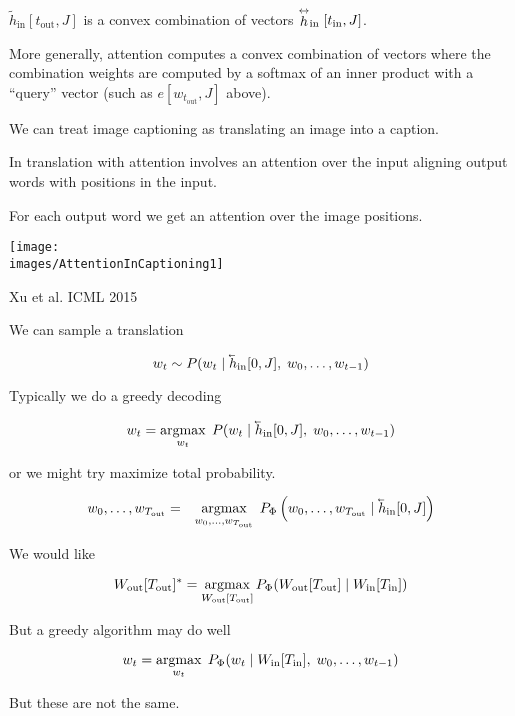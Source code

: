{\vfill
$\tilde{h}_\mathrm{in}[t_\mathrm{out},J]$ is a convex combination of vectors $\stackrel{\leftrightarrow}{h}_{\mathrm{in}}[t_{\mathrm{in}},J]$.

\vfill
More generally, attention computes a convex combination of vectors where the combination weights are computed by a softmax of an inner product with a ``query'' vector (such as $e[w_{t_{\mathrm{out}}},J]$ above).

We can treat image captioning as translating an image into a caption.

\vfill
In translation with attention involves an attention over the input aligning output words with positions in the input.

\vfill
For each output word we get an attention over the image positions.


\centerline{\texttt{[image: \\images/AttentionInCaptioning1]}}
\centerline{\Large Xu et al. ICML 2015}



We can sample a translation

$$w_t \sim P(w_t\;|\;\cev{h}_{\mathrm{in}}[0,J],\;w_0,\ldots,w_{t-1})$$

\vfill
Typically we do a greedy decoding

$$w_t = \argmax_{w_t}\; P(w_t\;|\;\cev{h}_{\mathrm{in}}[0,J],\;w_0,\ldots,w_{t-1})$$

\vfill
or we might try maximize total probability.

\begin{eqnarray*}
w_0,\ldots,w_{T_{\mathrm{out}}}
& = & \argmax_{w_0,\ldots,w_{T_{\mathrm{out}}}} \;P_\Phi\left(w_0,\ldots,w_{T_{\mathrm{out}}} \;|\; \cev{h}_{\mathrm{in}}[0,J]\right)
\end{eqnarray*}


We would like

\vfill
$$W_{\mathrm{out}}[T_{\mathrm{out}}]^* = \operatorname*{argmax}_{W_{\mathrm{out}}[T_{\mathrm{out}}]}
P_\Phi(W_{\mathrm{out}}[T_{\mathrm{out}}] \;|\;W_{\mathrm{in}}[T_{\mathrm{in}}])$$

\vfill
But a greedy algorithm may do well

\vfill
$$w_t = \operatorname*{argmax}_{w_t}\; P_\Phi(w_t\;|\;W_{\mathrm{in}}[T_{\mathrm{in}}],\;w_0,\ldots,w_{t-1})$$

\vfill
But these are not the same.

}
